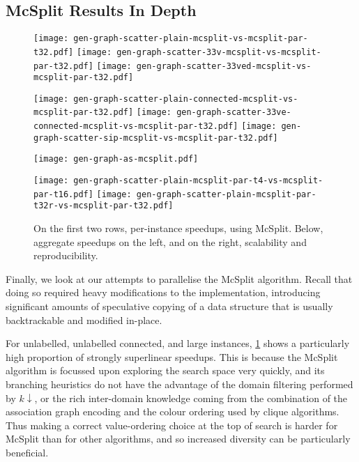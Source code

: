 \documentclass{llncs}
\begin{document}
\subsection{McSplit Results In Depth}

\begin{figure}[p]
    \texttt{[image: gen-graph-scatter-plain-mcsplit-vs-mcsplit-par-t32.pdf]}
    \hfill
    \texttt{[image: gen-graph-scatter-33v-mcsplit-vs-mcsplit-par-t32.pdf]}
    \hfill
    \texttt{[image: gen-graph-scatter-33ved-mcsplit-vs-mcsplit-par-t32.pdf]}

    \vspace*{0.2em}

    \texttt{[image: gen-graph-scatter-plain-connected-mcsplit-vs-mcsplit-par-t32.pdf]}
    \hfill
    \texttt{[image: gen-graph-scatter-33ve-connected-mcsplit-vs-mcsplit-par-t32.pdf]}
    \hfill
    \texttt{[image: gen-graph-scatter-sip-mcsplit-vs-mcsplit-par-t32.pdf]}

    \vspace*{2em}

    \begin{minipage}[c]{0.62\textwidth}
    \texttt{[image: gen-graph-as-mcsplit.pdf]}
    \end{minipage}
    \hfill
    \begin{minipage}[t]{0.35\textwidth}
    \texttt{[image: gen-graph-scatter-plain-mcsplit-par-t4-vs-mcsplit-par-t16.pdf]}
    \vspace*{0.2em}
    \texttt{[image: gen-graph-scatter-plain-mcsplit-par-t32r-vs-mcsplit-par-t32.pdf]}
    \end{minipage}

    \caption{On the first two rows, per-instance speedups, using McSplit. Below, aggregate speedups
    on the left, and on the right, scalability and reproducibility.}\label{figure:mcsplitscatter}
\end{figure}

Finally, we look at our attempts to parallelise the McSplit algorithm. Recall that doing so required
heavy modifications to the implementation, introducing significant amounts of speculative copying of a
data structure that is usually backtrackable and modified in-place.

For unlabelled, unlabelled connected, and large instances, \cref{figure:mcsplitscatter} shows a
particularly high proportion of strongly superlinear speedups. This is because the McSplit algorithm
is focussed upon exploring the search space very quickly, and its branching heuristics do not have
the advantage of the domain filtering performed by $k{\downarrow}$, or the rich inter-domain
knowledge coming from the combination of the association graph encoding and the colour ordering used
by clique algorithms.  Thus making a correct value-ordering choice at the top of search is harder
for McSplit than for other algorithms, and so increased diversity can be particularly beneficial.
\end{document}
